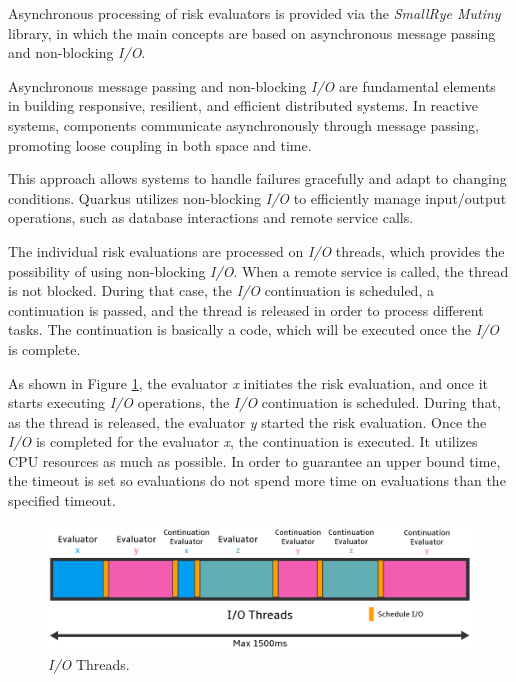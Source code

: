 Asynchronous processing of risk evaluators is provided via the \textit{SmallRye Mutiny} library, in which the main concepts are based on asynchronous message passing and non-blocking \textit{I/O}.

Asynchronous message passing and non-blocking \textit{I/O} are fundamental elements in building responsive, resilient, and efficient distributed systems.
In reactive systems, components communicate asynchronously through message passing, promoting loose coupling in both space and time.

This approach allows systems to handle failures gracefully and adapt to changing conditions.
Quarkus utilizes non-blocking \textit{I/O} to efficiently manage input/output operations, such as database interactions and remote service calls. \cite{quarkus-reactive}

The individual risk evaluations are processed on \textit{I/O} threads, which provides the possibility of using non-blocking \textit{I/O}.
When a remote service is called, the thread is not blocked.
During that case, the \textit{I/O} continuation is scheduled, a continuation is passed, and the thread is released in order to process different tasks.
The continuation is basically a code, which will be executed once the \textit{I/O} is complete.\cite{quarkus-reactive}

As shown in Figure \ref{fig:impl-risk-engine-io-threads}, the evaluator \textit{x} initiates the risk evaluation, and once it starts executing \textit{I/O} operations, the \textit{I/O} continuation is scheduled.
During that, as the thread is released, the evaluator \textit{y} started the risk evaluation.
Once the \textit{I/O} is completed for the evaluator \textit{x}, the continuation is executed.
It utilizes CPU resources as much as possible.
In order to guarantee an upper bound time, the timeout is set so evaluations do not spend more time on evaluations than the specified timeout.

\begin{figure}[htbp]
  \centering
  \includegraphics[width=1\textwidth]{img/sections/6-implementation/async.png}
  \caption{\textit{I/O} Threads.}
  \label{fig:impl-risk-engine-io-threads}
\end{figure}


